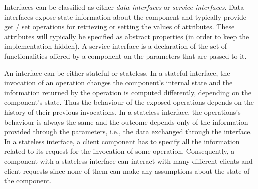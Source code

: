 \documentclass{CSSRforAfrica}
\begin{document}
Interfaces can be classified as either {\em data interfaces} or {\em service interfaces}.  Data interfaces expose state information about the component and typically provide get / set operations for retrieving or setting the values of attributes.   These attributes will typically be specified as abstract properties (in order to keep the implementation hidden).  A service interface is a declaration of the set of functionalities offered by a component on the parameters that are passed to it. 

An interface can be either stateful or stateless.   In a stateful interface, the invocation of an operation changes the component's internal state and the information returned by the operation is computed differently, depending on the component's state.   Thus the behaviour of the exposed operations depends on the history of their previous invocations.  In a stateless interface, the operations's behaviour is always the same and the outcome depends only of the information provided through the parameters, i.e., the data exchanged through the interface. In a stateless interface, a client component has to specify all the information related to its request for the invocation of some operation.  Consequently, a component with a stateless interface can interact with many different clients and client requests since none of them can make any assumptions about the state of the component.
\end{document}
